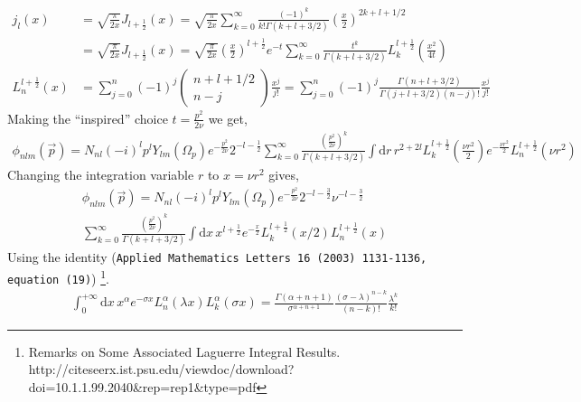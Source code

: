 \documentclass[10pt]{article}
\begin{document}
\begin{align*}
	j_l(x) &= \sqrt{ \frac{\pi}{2 x}} J_{l+\frac{1}{2}}(x) = \sqrt{ \frac{\pi}{2 x}} \sum_{k=0}^{\infty} \frac{ (-1)^{k}}{k! \Gamma(k+l+3/2)} \left(\frac{x}{2}\right)^{2k+l+1/2} \\
	&= \sqrt{ \frac{\pi}{2 x}} J_{l+\frac{1}{2}}(x) = \sqrt{ \frac{\pi}{2 x}} \left( \frac{x}{2} \right)^{l+\frac{1}{2}} e^{-t} \sum_{k=0}^{\infty} \frac{t^k}{\Gamma(k+l+3/2)} L^{l+\frac{1}{2}}_{k}\left( \frac{x^{2}}{4t} \right) \\
	L_{n}^{l+\frac{1}{2}}(x) &= \sum_{j=0}^{n} (-1)^{j} \left( \begin{array}{c} n + l +1/2 \\ n - j \end{array} \right) \frac{x^j}{j!} = \sum_{j=0}^{n} (-1)^{j} \frac{ \Gamma(n+l+3/2)}{\Gamma(j+l+3/2) (n-j)!} \frac{x^j}{j!}
\end{align*}
Making the ``inspired'' choice $t= \frac{p^{2}}{2 \nu}$ we get,
\begin{multline*}
	\phi_{n l m}(\vec{p}) = N_{nl} (-i)^{l} p^{l}  Y_{l m}(\Omega_p) e^{-\frac{p^{2}}{2 \nu}} 2^{-l-\frac{1}{2}} \sum_{k=0}^{\infty}  \frac{\left( \frac{p^{2}}{2 \nu} \right)^{k}}{\Gamma(k+l+3/2)} \int \text{d}r \, r^{2+2l} L_{k}^{l+\frac{1}{2}} ( \frac{\nu r^{2}}{2} ) e^{-\frac{\nu r^{2}}{2}} L_{n}^{l+\frac{1}{2}}( \nu r^{2}) 
\end{multline*}
Changing the integration variable $r$ to $x= \nu r^{2}$ gives,
\begin{multline*}
	\phi_{n l m}(\vec{p}) = N_{nl} (-i)^{l} p^{l}  Y_{l m}(\Omega_p) e^{-\frac{p^{2}}{2 \nu}} 2^{-l-\frac{3}{2}} \nu^{-l-\frac{3}{2}} \\
	 \sum_{k=0}^{\infty}  \frac{\left( \frac{p^{2}}{2 \nu} \right)^{k}}{\Gamma(k+l+3/2)} \int \text{d}x \, x^{l+\frac{1}{2}}  e^{-\frac{x}{2}} L_{k}^{l+\frac{1}{2}} \left( x/2 \right) L_{n}^{l+\frac{1}{2}}(x) 
\end{multline*}
Using the identity (\texttt{Applied Mathematics Letters 16 (2003) 1131-1136, equation (19)}) \footnote{ Remarks on Some Associated Laguerre Integral Results. \\ http://citeseerx.ist.psu.edu/viewdoc/download?doi=10.1.1.99.2040\&rep=rep1\&type=pdf }.
\begin{align*}
	\int_{0}^{+\infty} \text{d} x \, x^{\alpha} e^{-\sigma x} L_{n}^{\alpha}(\lambda x) L_{k}^{\alpha}( \sigma x) = \frac{\Gamma(\alpha+n+1)}{\sigma^{\alpha+n+1}} \frac{(\sigma - \lambda)^{n-k}}{(n-k)!} \frac{\lambda^{k}}{k!}
\end{align*}
\end{document}

